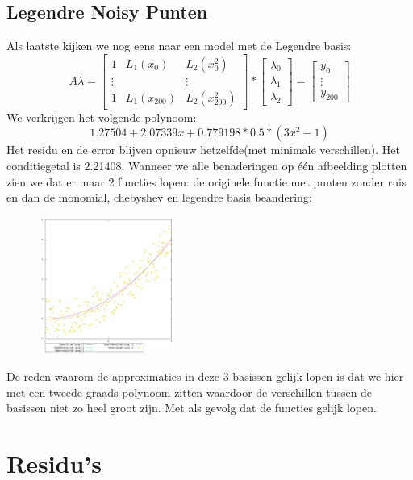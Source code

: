 \documentclass[10pt,a4paper,twocolumn]{article}
\begin{document}
\subsection{Legendre Noisy Punten}
Als laatste kijken we nog eens naar een model met de Legendre basis:
$$
A \lambda = \begin{bmatrix}
1 & L_{1}(x_{0} )& L_{2}(x^{2}_{0}) \\ 
\vdots &  & \vdots\\ 
1 & L_{1}(x_{200}) & L_{2}(x^{2}_{200})
\end{bmatrix}
* \begin{bmatrix}
\lambda_{0} \\
\lambda_{1}  \\
\lambda_{2} 
\end{bmatrix}
= \begin{bmatrix}
y_{0} \\
\vdots  \\
y_{200}
\end{bmatrix}
$$
We verkrijgen het volgende polynoom:
$$1.27504 + 2.07339x + 0.779198*0.5*(3x^{2}-1)$$
Het residu en de error blijven opnieuw hetzelfde(met minimale verschillen). Het conditiegetal is 2.21408. Wanneer we alle benaderingen op één afbeelding plotten zien we dat er maar 2 functies lopen: de originele functie met punten zonder ruis en dan de monomial, chebyshev en legendre basis beandering:
\begin{figure}[H]
\includegraphics[width=0.4\textwidth]{combinedLS}
\end{figure}
De reden waarom de approximaties in deze 3 basissen gelijk lopen is dat we hier met een tweede graads polynoom zitten waardoor de verschillen tussen de basissen niet zo heel groot zijn. Met als gevolg dat de functies gelijk lopen.
\section{Residu's}
\end{document}

